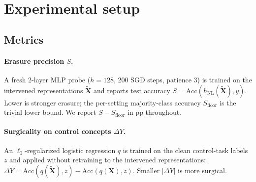 \section{Experimental setup}
\label{sec:experimental_setup}

\subsection{Metrics}
\label{sec:evaluation}

\paragraph{Erasure precision $S$.} A fresh 2-layer MLP probe ($h{=}128$, 200 SGD steps, patience 3) is trained on the intervened representations $\tilde{\mathbf{X}}$ and reports test accuracy $S = \mathrm{Acc}(h_{\mathrm{NL}}(\tilde{\mathbf{X}}), y)$. Lower is stronger erasure; the per-setting majority-class accuracy $S_{\text{floor}}$ is the trivial lower bound. We report $S - S_{\text{floor}}$ in pp throughout.

\paragraph{Surgicality on control concepts $\Delta Y$.} An $\ell_2$-regularized logistic regression $q$ is trained on the clean control-task labels $z$ and applied without retraining to the intervened representations: $\Delta Y = \mathrm{Acc}(q(\tilde{\mathbf{X}}), z) - \mathrm{Acc}(q(\mathbf{X}), z)$. Smaller $|\Delta Y|$ is more surgical.
